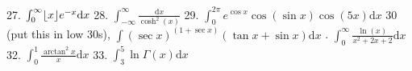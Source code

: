 \documentclass{article}
\DeclarePairedDelimiter{\floor}{\lfloor}{\rfloor}
\newcommand{\dd}{\mathrm{d}}
\begin{document}
\begin{flushleft}
27. $\int_0^{\infty} \floor{x}e^{-x} \dd x$ \newline \newline \newline
28. $\int_{-\infty}^{\infty} \frac{\dd x}{\cosh^2(x)}$ \newline  \newline \newline 
29. $\int_0^{2\pi} e^{\cos{x}}\cos(\sin{x})\cos(5x) \dd x$ \newline  \newline \newline 
30 (put this in low 30s), $\int (\sec{x})^{(1+\sec{x})}(\tan{x}+\sin{x}) \dd x$ \newline  \newline {}. $\int_0^{\infty} \frac{\ln(x)}{x^2+2x+2} \dd x$ \newline  \newline \newline 
32. $\int_0^1 \frac{\arctan^2{x}}{x} \dd x$ \newline  \newline \newline 
33. $\int_3^5 \ln{\Gamma(x)} \dd x$ \newline  \newline \newline 


\end{flushleft}
\end{document}
